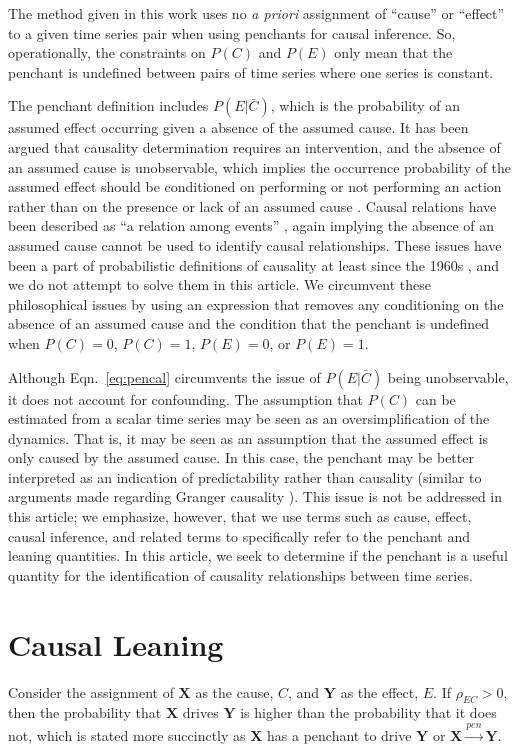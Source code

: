 \documentclass[twocolumn,aps,pre,groupedaddress]{revtex4-1}
\begin{document}
The method given in this work uses no {\em a priori} assignment of ``cause'' or ``effect'' to a given time series pair when using penchants for causal inference.  So, operationally, the constraints on $P(C)$ and $P(E)$ only mean that the penchant is undefined between pairs of time series where one series is constant. 

The penchant definition includes $P(E|\bar{C})$, which is the probability of an assumed effect occurring given a absence of the assumed cause.  It has been argued that causality determination requires an intervention, and the absence of an assumed cause is unobservable, which implies the occurrence probability of the assumed effect should be conditioned on performing or not performing an action rather than on the presence or lack of an assumed cause \cite{Pearl2000}.  Causal relations have been described as ``a relation among events'' \cite{Bunge1979}, again implying the absence of an assumed cause cannot be used to identify causal relationships.  These issues have been a part of probabilistic definitions of causality at least since the 1960s \cite{Suppes1970}, and we do not attempt to solve them in this article.  We circumvent these philosophical issues by using an expression that removes any conditioning on the absence of an assumed cause and the condition that the penchant is undefined when $P(C)=0$, $P(C)=1$, $P(E)=0$, or $P(E)=1$. 

Although Eqn.\ \ref{eq:pencal} circumvents the issue of $P(E|\bar{C})$ being unobservable, it does not account for confounding.  The assumption that $P(C)$ can be estimated from a scalar time series may be seen as an oversimplification of the dynamics.  That is, it may be seen as an assumption that the assumed effect is only caused by the assumed cause.  In this case, the penchant may be better interpreted as an indication of predictability rather than causality (similar to arguments made regarding Granger causality \cite{Sugihara2012}).  This issue  is not be addressed in this article;  we emphasize, however, that we use terms such as cause, effect, causal inference, and related terms to specifically refer to the penchant and leaning quantities.  In this article, we seek to determine if the penchant is a useful quantity for the identification of causality relationships between time series.

\section{Causal Leaning}
Consider the assignment of $\mathbf{X}$ as the cause, $C$, and $\mathbf{Y}$ as the effect, $E$.  If $\rho_{EC}>0$, then the probability that $\mathbf{X}$ drives $\mathbf{Y}$ is higher than the probability that it does not, which is stated more succinctly as $\mathbf{X}$ has a penchant to drive $\mathbf{Y}$ or $\mathbf{X}\xrightarrow{pen}\mathbf{Y}$.  
\end{document}
